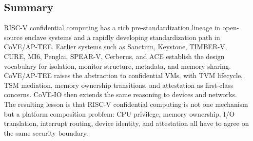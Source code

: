 \subsection{Summary}

RISC-V confidential computing has a rich pre-standardization lineage in
open-source enclave systems and a rapidly developing standardization path in
CoVE/AP-TEE. Earlier systems such as Sanctum, Keystone, TIMBER-V, CURE, MI6,
Penglai, SPEAR-V, Cerberus, and ACE establish the design vocabulary for
isolation, monitor structure, metadata, and memory sharing. CoVE/AP-TEE raises
the abstraction to confidential VMs, with TVM lifecycle, TSM mediation, memory
ownership transitions, and attestation as first-class concerns. CoVE-IO then
extends the same reasoning to devices and networks. The resulting lesson is
that RISC-V confidential computing is not one mechanism but a platform
composition problem: CPU privilege, memory ownership, I/O translation,
interrupt routing, device identity, and attestation all have to agree on the
same security boundary.
